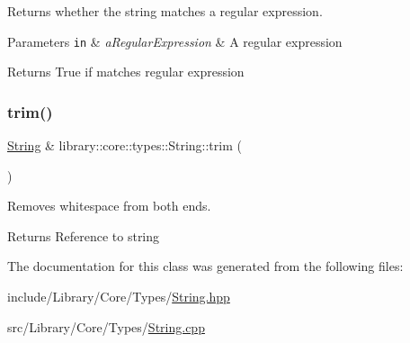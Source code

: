 Returns whether the string matches a regular expression. 





\begin{DoxyParams}[1]{Parameters}
\mbox{\tt in}  & {\em a\+Regular\+Expression} & A regular expression \\
\hline
\end{DoxyParams}
\begin{DoxyReturn}{Returns}
True if matches regular expression 
\end{DoxyReturn}
\mbox{\label{classlibrary_1_1core_1_1types_1_1_string_a42426ffb11bb0b2789ba0991064a01b5}} 
\subsubsection{\texorpdfstring{trim()}{trim()}}
{\footnotesize\ttfamily \hyperlink{classlibrary_1_1core_1_1types_1_1_string}{String} \& library\+::core\+::types\+::\+String\+::trim (\begin{DoxyParamCaption}{ }\end{DoxyParamCaption})}



Removes whitespace from both ends. 

\begin{DoxyReturn}{Returns}
Reference to string 
\end{DoxyReturn}


The documentation for this class was generated from the following files\+:\begin{DoxyCompactItemize}
\item 
include/\+Library/\+Core/\+Types/\hyperlink{_string_8hpp}{String.\+hpp}\item 
src/\+Library/\+Core/\+Types/\hyperlink{_string_8cpp}{String.\+cpp}\end{DoxyCompactItemize}

